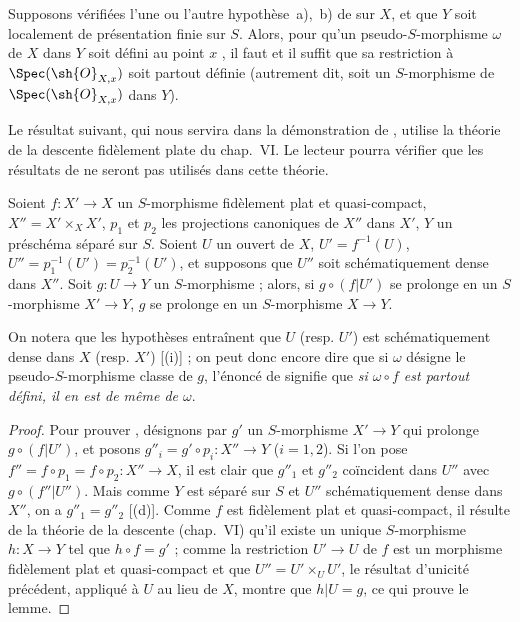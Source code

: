\begin{corollary}[20.3.9]
\label{IV.20.3.9}
Supposons vérifiées l'une ou l'autre hypothèse~a),~b) de  sur $X$, et que $Y$ soit localement de présentation finie sur $S$.
Alors, pour qu'un pseudo-$S$-morphisme $\omega$ de $X$ dans $Y$ soit défini au point $x$ , il faut et il suffit que sa restriction à $\Spec(\sh{O}_{X,x})$ soit partout définie (autrement dit, soit un $S$-morphisme de $\Spec(\sh{O}_{X,x})$ dans $Y$).
\end{corollary}

Le résultat suivant, qui nous servira dans la démonstration de , utilise la théorie de la descente fidèlement plate du chap.~VI.
Le lecteur pourra vérifier que les résultats de  ne seront pas utilisés dans cette théorie.

\begin{lemma}[20.3.10]
\label{IV.20.3.10}
Soient $f:X'\to X$ un $S$-morphisme fidèlement plat et quasi-compact, $X''=X'\times_X X'$, $p_1$ et $p_2$ les projections canoniques de $X''$ dans $X'$, $Y$ un préschéma séparé sur $S$.
Soient $U$ un ouvert de $X$, $U'=f^{-1}(U)$, $U''=p_1^{-1}(U')=p_2^{-1}(U')$, et supposons que $U''$ soit schématiquement dense dans $X''$.
Soit $g:U\to Y$ un $S$-morphisme ; alors, si $g\circ(f|U')$ se prolonge en un $S$-morphisme $X'\to Y$, $g$ se prolonge en un $S$-morphisme $X\to Y$.
\end{lemma}

On notera que les hypothèses entraînent que $U$ (resp. $U'$) est schématiquement dense dans $X$ (resp. $X'$) [(i)] ; on peut donc encore dire que si $\omega$ désigne le pseudo-$S$-morphisme classe de $g$, l'énoncé de  signifie que \emph{si $\omega\circ f$ est partout défini, il en est de même de $\omega$}.

\begin{proof}
Pour prouver , désignons par $g'$ un $S$-morphisme $X'\to Y$ qui prolonge $g\circ(f|U')$, et posons $g''_i=g'\circ p_i:X''\to Y$ ($i=1,2$).
Si l'on pose $f''=f\circ p_1=f\circ p_2:X''\to X$, il est clair que $g''_1$ et $g''_2$ coïncident dans $U''$ avec $g\circ(f''|U'')$.
Mais comme $Y$ est séparé sur $S$ et $U''$ schématiquement dense dans $X''$, on a $g''_1=g''_2$ [(d)].
Comme $f$ est fidèlement plat et quasi-compact, il résulte de la théorie de la descente (chap.~VI) qu'il existe un unique $S$-morphisme $h:X\to Y$ tel que $h\circ f=g'$ ; comme la restriction $U'\to U$ de $f$ est un morphisme fidèlement plat et quasi-compact et que $U''=U'\times_U U'$, le résultat d'unicité précédent, appliqué à $U$ au lieu de $X$, montre que $h|U=g$, ce qui prouve le lemme.
\end{proof}

